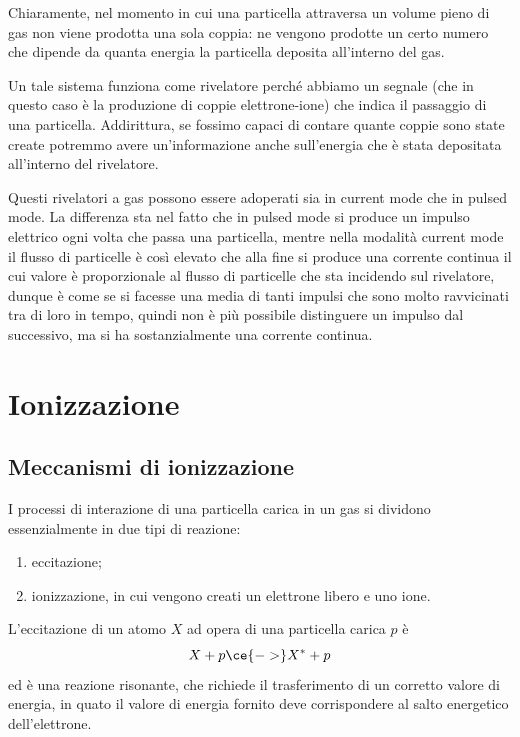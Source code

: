Chiaramente, nel momento in cui una particella attraversa un volume pieno di gas non viene prodotta una sola coppia: ne vengono prodotte un certo numero che dipende da quanta energia la particella deposita all'interno del gas.

Un tale sistema funziona come rivelatore perché abbiamo un segnale (che in questo caso è la produzione di coppie elettrone-ione) che indica il passaggio di una particella. Addirittura, se fossimo capaci di contare quante coppie sono state create potremmo avere un'informazione anche sull'energia che è stata depositata all'interno del rivelatore. 

Questi rivelatori a gas possono essere adoperati sia in current mode che in pulsed mode. La differenza sta nel fatto che in pulsed mode si produce un impulso elettrico ogni volta che passa una particella, mentre nella modalità current mode il flusso di particelle è così elevato che alla fine si produce una corrente continua il cui valore è proporzionale al flusso di particelle che sta incidendo sul rivelatore, dunque è come se si facesse una media di tanti impulsi che sono molto ravvicinati tra di loro in tempo, quindi non è più possibile distinguere un impulso dal successivo, ma si ha sostanzialmente una corrente continua.

\section{Ionizzazione}

\subsection{Meccanismi di ionizzazione}

I processi di interazione di una particella carica in un gas si dividono essenzialmente in due tipi di reazione:
\begin{enumerate}
   \item eccitazione;
   \item ionizzazione, in cui vengono creati un elettrone libero e uno ione.
\end{enumerate}
L'eccitazione di un atomo $X$ ad opera di una particella carica $p$ è
\begin{equation*}
   X + p \ce{->} X^* + p
\end{equation*}
ed è una reazione risonante, che richiede il trasferimento di un corretto valore di energia, in quato il valore di energia fornito deve corrispondere al salto energetico dell'elettrone.

